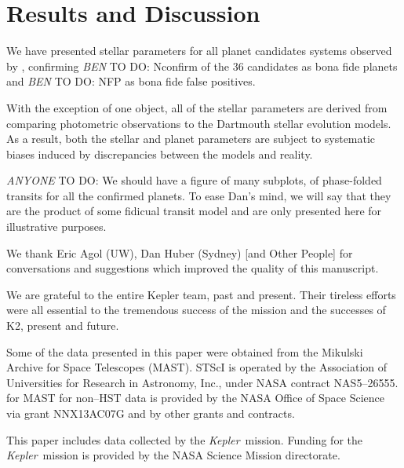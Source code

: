 \documentclass{emulateapj}
\newcommand{\project}[1]{\textsl{#1}}
\newcommand{\kep}{\project{Kepler}}
\newcommand{\paperit}{\citet{Foreman-Mackey15}}
\newcommand{\todo}[3]{{\color{#2} \emph{#1} TO DO: #3}}
\newcommand{\btmtodo}[1]{\todo{BEN}{red}{#1}}
\newcommand{\anytodo}[1]{\todo{ANYONE}{NavyBlue}{#1}}
\begin{document}
\section{Results and Discussion}

We have presented stellar parameters for all planet candidates systems observed by
\paperit, confirming \btmtodo{Nconfirm} of the 36 candidates as bona fide planets and
\btmtodo{NFP} as bona fide false positives.

With the exception of one object, all of the stellar parameters are derived from comparing
photometric observations to the Dartmouth stellar evolution models.
As a result, both the stellar and planet parameters are subject to systematic biases induced
by discrepancies between the models and reality.


\anytodo{We should have a figure of many subplots, of phase-folded
transits for all the confirmed planets.
To ease Dan's mind, we will say that they are the product of
some fidicual transit model and are only presented here for illustrative
purposes.}



\acknowledgements
We thank Eric Agol (UW), Dan Huber (Sydney) [and Other People] for conversations and
suggestions which improved the quality of this manuscript.


We are grateful to the entire Kepler team, past and present.
Their tireless efforts were all essential to the tremendous success of the mission and the
successes of K2, present and future.


Some of the data presented in this paper were obtained from the Mikulski
Archive for Space Telescopes (MAST).
STScI is operated by the Association of Universities for Research
in Astronomy, Inc., under NASA contract NAS5--26555.
for MAST for non--HST data is provided by the NASA Office of Space
Science via grant NNX13AC07G and by other grants and contracts.

This paper includes data collected by the \kep\ mission.
Funding for the \kep\ mission is provided by the NASA Science
Mission directorate.
\end{document}
